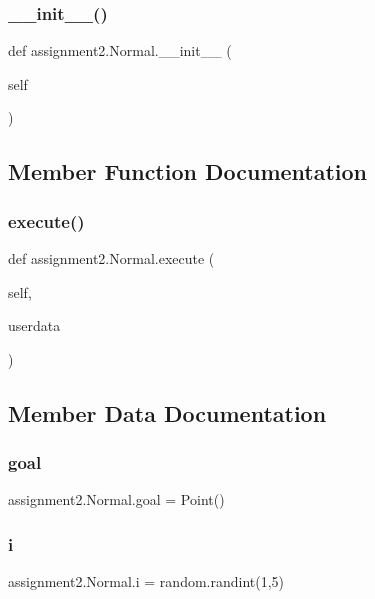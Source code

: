 \subsubsection{\+\_\+\+\_\+init\+\_\+\+\_\+()}
{\footnotesize\ttfamily def assignment2.\+Normal.\+\_\+\+\_\+init\+\_\+\+\_\+ (\begin{DoxyParamCaption}\item[{}]{self }\end{DoxyParamCaption})}



\subsection{Member Function Documentation}
\mbox{\label{classassignment2_1_1_normal_a72ffa30dee7cf3ffa51028cdda13a8c5}} 
\subsubsection{execute()}
{\footnotesize\ttfamily def assignment2.\+Normal.\+execute (\begin{DoxyParamCaption}\item[{}]{self,  }\item[{}]{userdata }\end{DoxyParamCaption})}



\subsection{Member Data Documentation}
\mbox{\label{classassignment2_1_1_normal_a670f69e0f38df894921acc23e44825e4}} 
\subsubsection{goal}
{\footnotesize\ttfamily assignment2.\+Normal.\+goal = Point()\hspace{0.3cm}{\ttfamily [static]}}

\mbox{\label{classassignment2_1_1_normal_a944baa609f264c2642192a6657c25444}} 
\subsubsection{i}
{\footnotesize\ttfamily assignment2.\+Normal.\+i = random.\+randint(1,5)\hspace{0.3cm}{\ttfamily [static]}}

